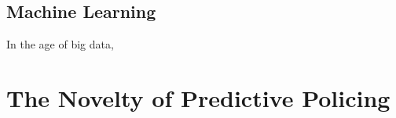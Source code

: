\documentclass[12pt]{article} %
\begin{document}

\subsection{Machine Learning} \label{subsec:machinelearning}%
In the age of big data, 











\section{The Novelty of Predictive Policing}\label{sec:oldvnew} %
\end{document}

